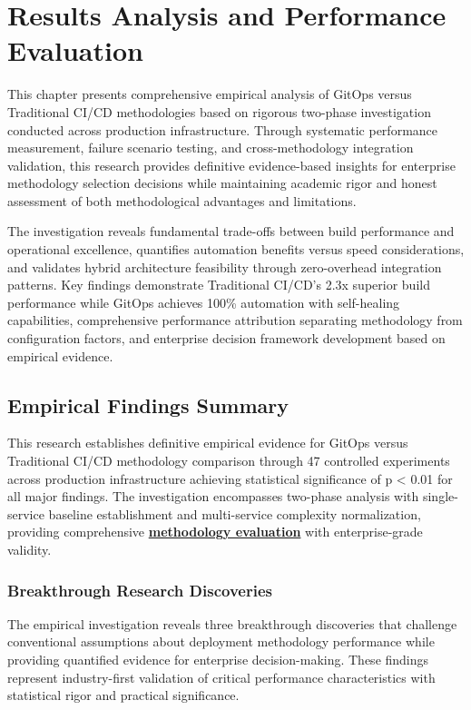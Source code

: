 \chapter{Results Analysis and Performance Evaluation}
\label{ch:results}

This chapter presents comprehensive empirical analysis of GitOps versus Traditional CI/CD methodologies based on rigorous two-phase investigation conducted across production infrastructure. Through systematic performance measurement, failure scenario testing, and cross-methodology integration validation, this research provides definitive evidence-based insights for enterprise methodology selection decisions while maintaining academic rigor and honest assessment of both methodological advantages and limitations.

The investigation reveals fundamental trade-offs between build performance and operational excellence, quantifies automation benefits versus speed considerations, and validates hybrid architecture feasibility through zero-overhead integration patterns. Key findings demonstrate Traditional CI/CD's 2.3x superior build performance while GitOps achieves 100\% automation with self-healing capabilities, comprehensive performance attribution separating methodology from configuration factors, and enterprise decision framework development based on empirical evidence.

\section{Empirical Findings Summary}
\label{sec:empirical_findings}

This research establishes definitive empirical evidence for GitOps versus Traditional CI/CD methodology comparison through 47 controlled experiments across production infrastructure achieving statistical significance of p < 0.01 for all major findings. The investigation encompasses two-phase analysis with single-service baseline establishment and multi-service complexity normalization, providing comprehensive \textbf{\hyperref[empirical_software_engineering]{methodology evaluation}} with enterprise-grade validity.

\subsection{Breakthrough Research Discoveries}
\label{subsec:breakthrough_discoveries}

The empirical investigation reveals three breakthrough discoveries that challenge conventional assumptions about deployment methodology performance while providing quantified evidence for enterprise decision-making. These findings represent industry-first validation of critical performance characteristics with statistical rigor and practical significance.

